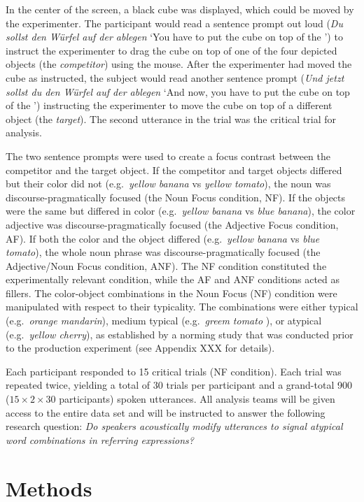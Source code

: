 \documentclass[
  12pt,
]{article}
\begin{document}
In the center of the screen, a black cube was displayed, which could be moved by the experimenter.
The participant would read a sentence prompt out loud (\emph{Du sollst den Würfel auf der ablegen} `You have to put the cube on top of the ') to instruct the experimenter to drag the cube on top of one of the four depicted objects (the \emph{competitor}) using the mouse.
After the experimenter had moved the cube as instructed, the subject would read another sentence prompt (\emph{Und jetzt sollst du den Würfel auf der ablegen} `And now, you have to put the cube on top of the ') instructing the experimenter to move the cube on top of a different object (the \emph{target}).
The second utterance in the trial was the critical trial for analysis.

The two sentence prompts were used to create a focus contrast between the competitor and the target object.
If the competitor and target objects differed but their color did not (e.g.~\emph{yellow banana} vs \emph{yellow tomato}), the noun was discourse-pragmatically focused (the Noun Focus condition, NF).
If the objects were the same but differed in color (e.g.~\emph{yellow banana} vs \emph{blue banana}), the color adjective was discourse-pragmatically focused (the Adjective Focus condition, AF).
If both the color and the object differed (e.g.~\emph{yellow banana} vs \emph{blue tomato}), the whole noun phrase was discourse-pragmatically focused (the Adjective/Noun Focus condition, ANF).
The NF condition constituted the experimentally relevant condition, while the AF and ANF conditions acted as fillers.
The color-object combinations in the Noun Focus (NF) condition were manipulated with respect to their typicality.
The combinations were either typical (e.g.~\emph{orange mandarin}), medium typical (e.g.~\emph{greem tomato} ), or atypical (e.g.~\emph{yellow cherry}), as established by a norming study that was conducted prior to the production experiment (see Appendix XXX for details).

Each participant responded to 15 critical trials (NF condition).
Each trial was repeated twice, yielding a total of 30 trials per participant and a grand-total 900 (\(15 \times 2 \times 30\) participants) spoken utterances.
All analysis teams will be given access to the entire data set and will be instructed to answer the following research question: \emph{Do speakers acoustically modify utterances to signal atypical word combinations in referring expressions?}

\hypertarget{methods}{%
\section{Methods}\label{methods}}
\end{document}
